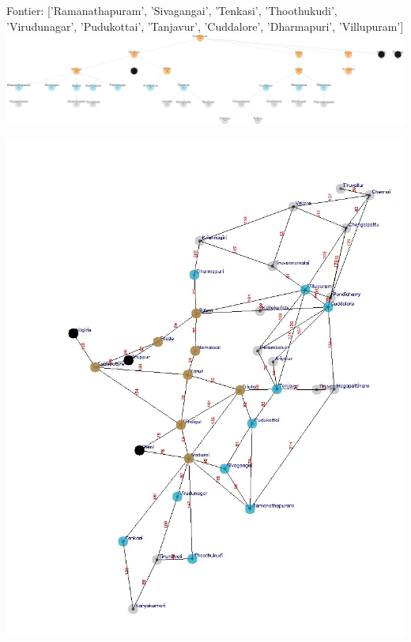 \documentclass[xcolor=table]{beamer}
\begin{document}
\begin{frame}
  { \tiny Fontier: ['Ramanathapuram', 'Sivagangai', 'Tenkasi', 'Thoothukudi', 'Virudunagar', 'Pudukottai', 'Tanjavur', 'Cuddalore', 'Dharmapuri', 'Villupuram'] }
  \includegraphics[width=1\textwidth]{../BFSNodes/16-1.png}
  \begin{center}
    \includegraphics[height=0.55\textheight]{../BFSoutput/tamilBFS14.jpg}
  \end{center}
\end{frame}
\end{document}
